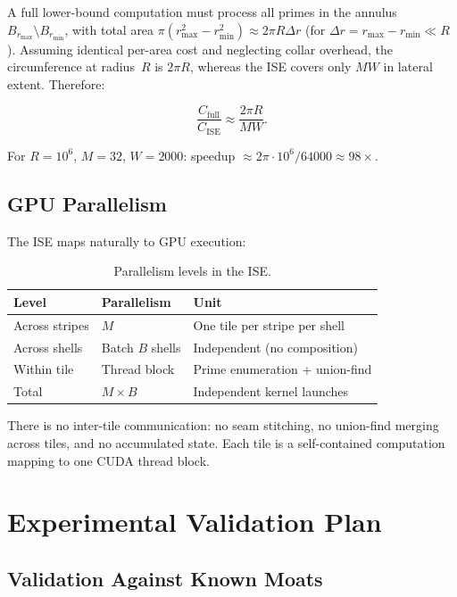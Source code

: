\documentclass[11pt,a4paper]{article}
\theoremstyle{definition}
\theoremstyle{remark}
\begin{document}
A full lower-bound computation must process all primes in the annulus
$B_{r_{\max}} \setminus B_{r_{\min}}$, with total area
$\pi(r_{\max}^2 - r_{\min}^2) \approx 2\pi R \Delta r$ (for
$\Delta r = r_{\max} - r_{\min} \ll R$).  Assuming identical per-area
cost and neglecting collar overhead, the circumference at
radius~$R$ is $2\pi R$, whereas the ISE covers only $MW$ in lateral
extent.  Therefore:

\begin{equation}\label{eq:speedup}
  \frac{C_{\mathrm{full}}}{C_{\mathrm{ISE}}}
  \approx \frac{2\pi R}{MW}.
\end{equation}

For $R = 10^6$, $M = 32$, $W = 2000$: speedup
$\approx 2\pi \cdot 10^6 / 64000 \approx 98\times$.

\subsection{GPU Parallelism}

The ISE maps naturally to GPU execution:

\begin{table}[ht]
\centering
\caption{Parallelism levels in the ISE.}
\label{tab:gpu}
\begin{tabular}{@{}lll@{}}
\toprule
Level & Parallelism & Unit \\
\midrule
Across stripes & $M$ & One tile per stripe per shell \\
Across shells  & Batch $B$ shells & Independent (no composition) \\
Within tile    & Thread block   & Prime enumeration + union-find \\
\midrule
Total          & $M \times B$   & Independent kernel launches \\
\bottomrule
\end{tabular}
\end{table}

\noindent
There is no inter-tile communication: no seam stitching, no
union-find merging across tiles, and no accumulated state.  Each tile
is a self-contained computation mapping to one CUDA thread block.

\section{Experimental Validation Plan}\label{sec:exp}

\subsection{Validation Against Known Moats}
\end{document}
